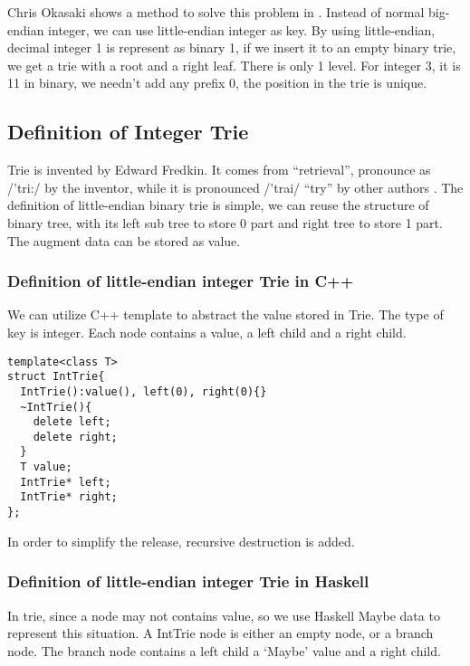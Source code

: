 \documentclass{article}
\begin{document}
Chris Okasaki shows a method to solve this problem in \cite{okasaki-int-map}. Instead of 
normal big-endian integer, we can use little-endian integer as key. By using little-endian,
decimal integer 1 is represent as binary 1, if we insert it to an empty binary trie, we
get a trie with a root and a right leaf. There is only 1 level. For integer 3, it is 11 in 
binary, we needn't add any prefix 0, the position in the trie is unique.

\subsection{Definition of Integer Trie}
Trie is invented by Edward Fredkin. It comes from ``retrieval'', pronounce 
as /'tri:/ by the inventor, while it is pronounced /'trai/ ``try'' 
by other authors \cite{wiki-trie}.
The definition of little-endian binary trie is simple, we can reuse the structure
of binary tree, with its left sub tree to store 0 part and right tree to store 1 part.
The augment data can be stored as value.

\subsubsection*{Definition of little-endian integer Trie in C++}
We can utilize C++ template to abstract the value stored in Trie. The type
of key is integer. Each node contains a value, a left child and a right child.

\lstset{language=C++}
\begin{lstlisting}
template<class T>
struct IntTrie{
  IntTrie():value(), left(0), right(0){}
  ~IntTrie(){
    delete left;
    delete right;
  }
  T value;
  IntTrie* left;
  IntTrie* right;
};
\end{lstlisting}

In order to simplify the release, recursive destruction is added.

\subsubsection*{Definition of little-endian integer Trie in Haskell}
In trie, since a node may not contains value, so we use Haskell Maybe data to represent
this situation. A IntTrie node is either an empty node, or a branch node. The branch
node contains a left child a `Maybe' value and a right child. 
\end{document}
